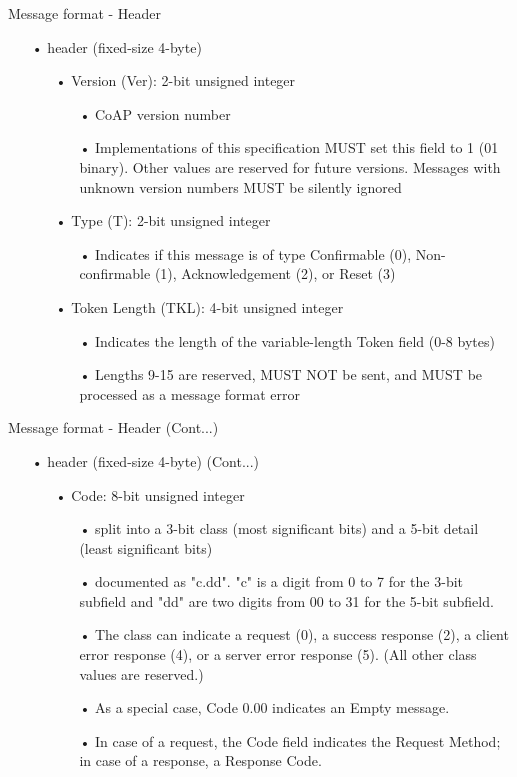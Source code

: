 \documentclass[11pt]{beamer}
\begin{document}
\begin{frame}{Message format - Header}
\begin{itemize}
\item[•] header (fixed-size 4-byte)
\begin{itemize}
\item[•] Version (Ver):  2-bit unsigned integer
\begin{itemize}
\item[•] CoAP version number
\item[•] Implementations of this specification MUST set this field to 1 (01 binary).  Other values are reserved for future versions. Messages with unknown version numbers MUST be silently ignored
\end{itemize}
\item[•] Type (T):  2-bit unsigned integer
\begin{itemize}
\item[•] Indicates if this message is of type Confirmable (0), Non-confirmable (1), Acknowledgement (2), or Reset (3)
\end{itemize}
\item[•] Token Length (TKL):  4-bit unsigned integer
\begin{itemize}
\item[•] Indicates the length of the variable-length Token field (0-8 bytes)
\item[•] Lengths 9-15 are reserved, MUST NOT be sent, and MUST be processed as a message format error
\end{itemize}
\end{itemize}
\end{itemize}
\end{frame}
\begin{frame}{Message format - Header (Cont...)}
\begin{itemize}
\item[•] header (fixed-size 4-byte) (Cont...)
\begin{itemize}
\item[•] Code:  8-bit unsigned integer
\begin{itemize}
\item[•] split into a 3-bit class (most significant bits) and a 5-bit detail (least significant bits)
\item[•] documented as "c.dd". "c" is a digit from 0 to 7 for the 3-bit subfield and "dd" are two digits from 00 to 31 for the 5-bit subfield. 
\item[•] The class can indicate a request (0), a success response (2), a client error response (4), or a server error response (5).  (All other class values are reserved.)
\item[•] As a special case, Code 0.00 indicates an Empty message.
\item[•] In case of a request, the Code field indicates the Request Method; in case of a response, a Response Code.
\end{itemize}
\end{itemize}
\end{itemize}
\end{frame}
\end{document}
